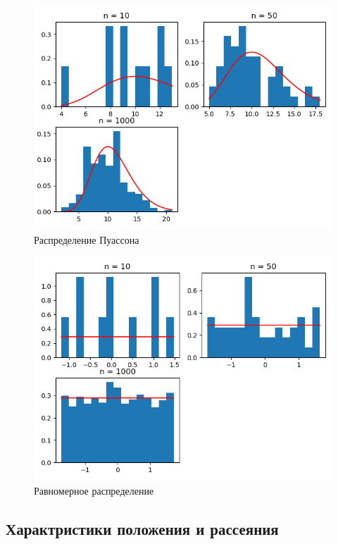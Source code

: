 \documentclass[a4]{article}
\begin{document}
\begin{center}
				\begin{figure}
					\includegraphics[width=\textwidth]{poisson.png}
					\caption[Распределение Пуассона]{Распределение Пуассона}
				\end{figure}
				\begin{figure}
					\includegraphics[width=\textwidth]{uniform.png}
					\caption[Равномерное распределение]{Равномерное распределение}
				\end{figure}
	
		\end{center}
		
			\subsection{Характристики положения и рассеяния}
		
\end{document}
